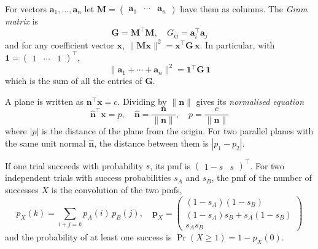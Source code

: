 \item For vectors $\mathbf{a}_1, \dots, \mathbf{a}_n$ let $\mathbf{M} = \begin{pmatrix} \mathbf{a}_1 & \cdots & \mathbf{a}_n \end{pmatrix}$ have them as columns. The \emph{Gram matrix} is
\begin{equation}
\mathbf{G} = \mathbf{M}^{\top}\mathbf{M}, \quad G_{ij} = \mathbf{a}_i^{\top}\mathbf{a}_j
\label{c12eq:gramsum}
\end{equation}
and for any coefficient vector $\mathbf{x}$, $\|\mathbf{M}\mathbf{x}\|^2 = \mathbf{x}^{\top}\mathbf{G}\,\mathbf{x}$. In particular, with $\mathbf{1} = \begin{pmatrix} 1 & \cdots & 1 \end{pmatrix}^{\top}$,
\begin{equation}
\|\mathbf{a}_1 + \cdots + \mathbf{a}_n\|^2 = \mathbf{1}^{\top}\mathbf{G}\,\mathbf{1}
\label{c12eq:gramsumnorm}
\end{equation}
which is the sum of all the entries of $\mathbf{G}$.

\item A plane is written as $\mathbf{n}^{\top}\mathbf{x} = c$. Dividing by $\|\mathbf{n}\|$ gives its \emph{normalised equation}
\begin{equation}
\hat{\mathbf{n}}^{\top}\mathbf{x} = p, \quad \hat{\mathbf{n}} = \frac{\mathbf{n}}{\|\mathbf{n}\|}, \quad p = \frac{c}{\|\mathbf{n}\|}
\label{c12eq:normalised}
\end{equation}
where $|p|$ is the distance of the plane from the origin. For two parallel planes with the same unit normal $\hat{\mathbf{n}}$, the distance between them is $\left|p_1 - p_2\right|$.

\item If one trial succeeds with probability $s$, its pmf is $\begin{pmatrix} 1 - s & s \end{pmatrix}^{\top}$. For two independent trials with success probabilities $s_A$ and $s_B$, the pmf of the number of successes $X$ is the convolution of the two pmfs,
\begin{equation}
p_X(k) = \sum_{i + j = k} p_A(i)\,p_B(j), \quad
\mathbf{p}_X = \begin{pmatrix} (1 - s_A)(1 - s_B) \\ (1 - s_A)s_B + s_A(1 - s_B) \\ s_As_B \end{pmatrix}
\label{c12eq:pmfsum}
\end{equation}
and the probability of at least one success is $\Pr(X \ge 1) = 1 - p_X(0)$.

